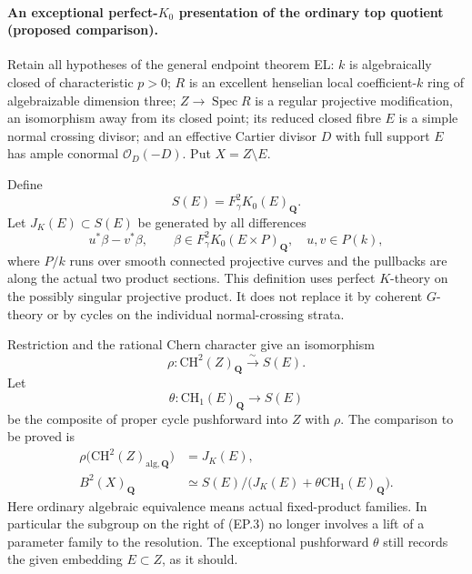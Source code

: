 \paragraph{An exceptional perfect-$K_0$ presentation of the ordinary
top quotient (proposed comparison).}
Retain all hypotheses of the general endpoint theorem EL: $k$ is
algebraically closed of characteristic $p>0$; $R$ is an excellent
henselian local coefficient-$k$ ring of algebraizable dimension three;
$Z\to\operatorname{Spec}R$ is a regular projective modification,
an isomorphism away from its closed point; its reduced closed fibre
$E$ is a simple normal crossing divisor; and an effective Cartier
divisor $D$ with full support $E$ has ample conormal
$\mathcal O_D(-D)$.  Put $X=Z\setminus E$.

Define
\[
 S(E)=F_\gamma^2K_0(E)_{\mathbf Q}.
\]
Let $J_K(E)\subset S(E)$ be generated by all differences
\begin{equation}
          u^*\beta-v^*\beta,
 \qquad \beta\in F_\gamma^2K_0(E\times P)_{\mathbf Q},
 \quad u,v\in P(k),                              \tag{EP.1}
\end{equation}
where $P/k$ runs over smooth connected projective curves and the
pullbacks are along the actual two product sections.  This definition
uses perfect $K$-theory on the possibly singular projective product.
It does not replace it by coherent $G$-theory or by cycles on the
individual normal-crossing strata.

Restriction and the rational Chern character give an isomorphism
\begin{equation}
 \rho:\mathrm{CH}^2(Z)_{\mathbf Q}
       \xrightarrow{\sim}S(E).
                                                        \tag{EP.2}
\end{equation}
Let
\[
 \theta:\mathrm{CH}_1(E)_{\mathbf Q}\longrightarrow S(E)
\]
be the composite of proper cycle pushforward into $Z$ with $\rho$.
The comparison to be proved is
\begin{align}
 \rho\bigl(\mathrm{CH}^2(Z)_{\mathrm{alg},\mathbf Q}\bigr)
       &=J_K(E),                                      \tag{EP.3}\\
 B^2(X)_{\mathbf Q}
       &\simeq S(E)\big/
          \bigl(J_K(E)+\theta\mathrm{CH}_1(E)_{\mathbf Q}\bigr).
                                                        \tag{EP.4}
\end{align}
Here ordinary algebraic equivalence means actual fixed-product
families.  In particular the subgroup on the right of (EP.3) no
longer involves a lift of a parameter family to the resolution.
The exceptional pushforward $\theta$ still records the given
embedding $E\subset Z$, as it should.

